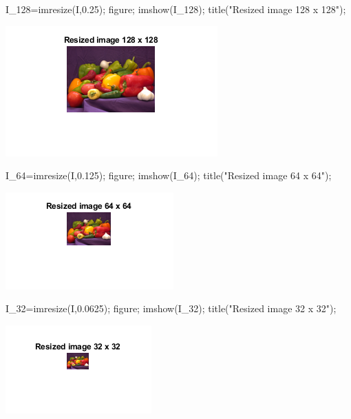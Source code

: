 \documentclass[12pt, onecolumn]{IEEEtran}
\begin{document}
\begin{matlabcode}
I_128=imresize(I,0.25); %
figure; imshow(I_128); title("Resized image 128 x 128");
\end{matlabcode}
\begin{center}
\includegraphics[width=\maxwidth{30.90817862518816em}]{figure_9.png}
\end{center}
\begin{matlabcode}
I_64=imresize(I,0.125); %
figure; imshow(I_64); title("Resized image 64 x 64");
\end{matlabcode}
\begin{center}
\includegraphics[width=\maxwidth{24.485699949824387em}]{figure_10.png}
\end{center}
\begin{matlabcode}
I_32=imresize(I,0.0625); %
figure; imshow(I_32); title("Resized image 32 x 32");
\end{matlabcode}
\begin{center}
\includegraphics[width=\maxwidth{21.274460612142498em}]{figure_11.png}
\end{center}

\end{document}
